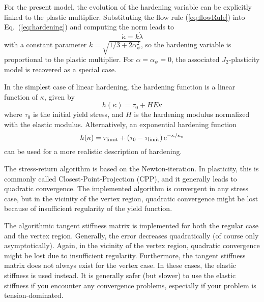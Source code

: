 \documentclass[a4paper]{article}
\newcommand{\be}{\begin{equation}}
\newcommand{\ee}{\end{equation}}
\newcommand{\alphaPsi}{\alpha_{\psi}}
\newcommand{\kappac}{\kappa_{\mathrm{c}}}
\begin{document}
For the present model, the evolution
of the hardening variable can be explicitly linked to the plastic
multiplier.
Substituting the flow rule
(\ref{eq:flowRule}) into Eq.~(\ref{eq:hardening}) and computing the norm
leads to
\be
\label{eq:kFactor}
\dot\kappa = k \dot \lambda
\ee
with a constant parameter $k = \sqrt{1/3 + 2 \alphaPsi^2}$, so the
hardening variable is proportional to the plastic multiplier.
For $\alpha=\alphaPsi=0$, the associated $J_2$-plasticity model
is recovered as a special case.

In the simplest case of linear hardening, the hardening function is a
linear function of $\kappa$, given by
\be\label{bilin-soft}
h(\kappa)=\tau_0+H E\kappa
\ee
where $\tau_0$ is the initial yield stress, and $H$ is the
hardening modulus normalized with the elastic modulus.
Alternatively, an exponential hardening function
\be
h(\kappa) = \tau_{\mathrm{limit}} + \left( \tau_0 - \tau_{\mathrm{limit}} \right) \rm e^{-\kappa/\kappac}
\ee
can be used for a more realistic description of hardening.

The stress-return algorithm is based on the Newton-iteration.
In plasticity, this is commonly called Closest-Point-Projection (CPP),
and it generally leads to quadratic convergence.
The implemented algorithm is convergent in any stress case, but
in the vicinity of the vertex region, quadratic convergence might be
lost because of insufficient regularity of the yield function.

The algorithmic tangent stiffness matrix is implemented for both the
regular case and the vertex region.
Generally, the error decreases quadratically (of course only asymptotically).
Again, in the vicinity of the vertex region, quadratic convergence
might be lost due to insufficient regularity.
Furthermore, the tangent stiffness matrix does not always exist for
the vertex case. In these cases, the elastic stiffness is used
instead.
It is generally safer (but slower) to use the elastic stiffness if you
encounter any convergence problems, especially if your problem is
tension-dominated.
\end{document}
